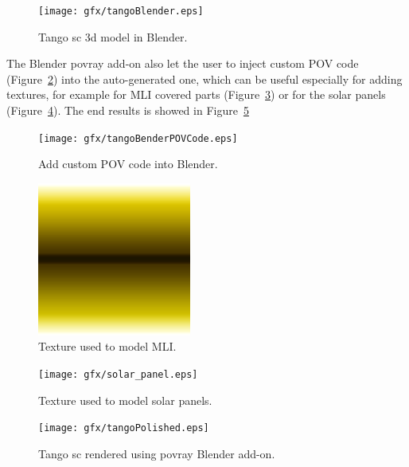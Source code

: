 \begin{figure}[htbp]
  \centering
  \texttt{[image: gfx/tangoBlender.eps]}
  \caption{Tango \acrshort{sc} \acrshort{3d} model in Blender.}
  \label{fig:tangoblender}
\end{figure}

The Blender \acrshort{povray} add-on also let the user to inject custom POV code (Figure~\ref{fig:tangoblenderpov}) into the auto-generated one, which can be useful especially for adding textures, for example for MLI covered parts (Figure~\ref{fig:mliTexture}) or for the solar panels (Figure~\ref{fig:solarPanelTexture}). The end results is showed in Figure~\ref{fig:tangoblenderfinal}

\begin{figure}[htbp]
  \centering
  \texttt{[image: gfx/tangoBenderPOVCode.eps]}
  \caption{Add custom POV code into Blender.}
  \label{fig:tangoblenderpov}
\end{figure}

\begin{figure}[htbp]
  \centering
  \includegraphics[width=0.45\textwidth]{gfx/foil_gold_ramp.eps}
  \caption{Texture used to model MLI.}
  \label{fig:mliTexture}
\end{figure}

\begin{figure}[htbp]
  \centering
  \texttt{[image: gfx/solar\_panel.eps]}
  \caption{Texture used to model solar panels.}
  \label{fig:solarPanelTexture}
\end{figure}

\begin{figure}[htbp]
  \centering
  \texttt{[image: gfx/tangoPolished.eps]}
  \caption{Tango \acrshort{sc} rendered using \acrshort{povray} Blender add-on.}
  \label{fig:tangoblenderfinal}
\end{figure}

